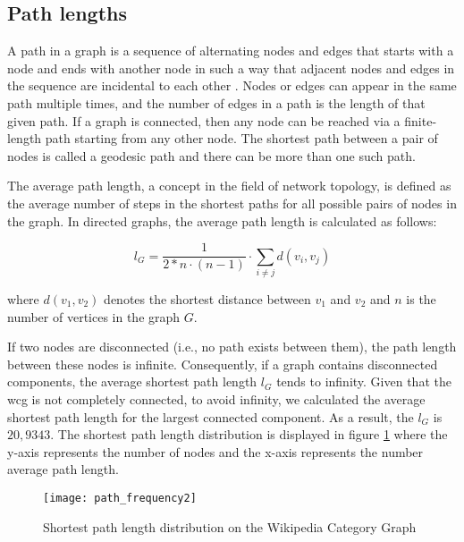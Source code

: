 \subsection{\hspace*{3pt} Path lengths}

A path in a graph is a sequence of alternating nodes and edges that starts with a node and ends with another node in such a way that adjacent nodes and edges in the sequence are incidental to each other \cite{newman2010networks}. Nodes or edges can appear in the same path multiple times, and the number of edges in a path is the length of that given path. If a graph is connected, then any node can be reached via a finite-length path starting from any other node. The shortest path between a pair of nodes is called a geodesic path and there can be more than one such path.

The average path length, a concept in the field of network topology, is defined as the average number of steps in the shortest paths for all possible pairs of nodes in the graph. In directed graphs, the average path length is calculated as follows:

\begin{equation}
l_{G}={\frac  {1}{2 * n\cdot (n-1)}}\cdot \sum _{{i\neq j}}d(v_{i},v_{j})
\end{equation}

where $d(v_{1},v_{2})$ denotes the shortest distance between $v_1$ and $v_2$ and $n$ is the number of vertices in the graph $G$. 

If two nodes are disconnected (i.e., no path exists between them), the path length between these nodes is infinite. Consequently, if a graph contains disconnected components, the average shortest path length $l_G$ tends to infinity. 
Given that the \gls{wcg} is not completely connected, to avoid infinity, we calculated the average shortest path length for the largest connected component. As a result, the $l_G$ is $20,9343$. The shortest path length distribution is displayed in figure \ref{fig:path-distribution} where the y-axis represents the number of nodes and the x-axis represents the number average path length.



\begin{figure}[H]
  \texttt{[image: path\_frequency2]}
  \caption{Shortest path length distribution on the Wikipedia Category Graph}
  \label{fig:path-distribution}
\end{figure}


